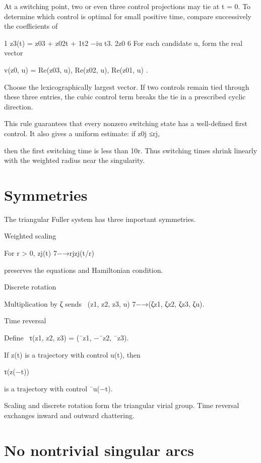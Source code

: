At a switching point, two or even three control projections may tie at t = 0. To determine which control is optimal for small positive time, compare successively the coefficients of


1 z3(t) = z03 + z02t + 1t2 −iu t3. 2z0 6 For each candidate u, form the real vector


v(z0, u) = Re(z03, u), Re(z02, u), Re(z01, u) .


Choose the lexicographically largest vector. If two controls remain tied through these three entries, the cubic control term breaks the tie in a prescribed cyclic direction.


This rule guarantees that every nonzero switching state has a well-defined first control. It also gives a uniform estimate: if z0j ≤rj,


then the first switching time is less than 10r. Thus switching times shrink linearly with the weighted radius near the singularity.


\section{Symmetries}

The triangular Fuller system has three important symmetries.


Weighted scaling


For r > 0, zj(t) 7−→rjzj(t/r)


preserves the equations and Hamiltonian condition.


Discrete rotation


\begin{displaytext}
Multiplication by ζ sends \
(z1, z2, z3, u) 7−→(ζz1, ζz2, ζz3, ζu).
\end{displaytext}

Time reversal


\begin{displaytext}
Define \
τ(z1, z2, z3) = (¯z1, −¯z2, ¯z3).
\end{displaytext}

If z(t) is a trajectory with control u(t), then


τ(z(−t))


is a trajectory with control ¯u(−t).


Scaling and discrete rotation form the triangular virial group. Time reversal exchanges inward and outward chattering.


\section{No nontrivial singular arcs}

